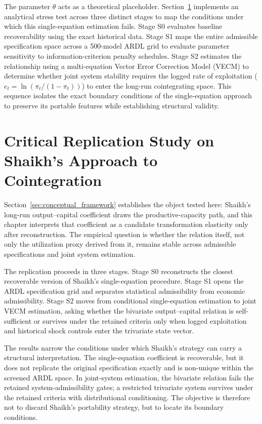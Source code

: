 \documentclass[11pt]{article}
\begin{document}
The parameter $\theta$ acts as a theoretical placeholder. Section~\ref{sec:replication_strategy} implements an analytical stress test across three distinct stages to map the conditions under which this single-equation estimation fails. Stage S0 evaluates baseline recoverability using the exact historical data. Stage S1 maps the entire admissible specification space across a 500-model ARDL grid to evaluate parameter sensitivity to information-criterion penalty schedules. Stage S2 estimates the relationship using a multi-equation Vector Error Correction Model (VECM) to determine whether joint system stability requires the logged rate of exploitation ($e_t = \ln(\pi_t / (1 - \pi_t))$) to enter the long-run cointegrating space. This sequence isolates the exact boundary conditions of the single-equation approach to preserve its portable features while establishing structural validity.

\section{Critical Replication Study on Shaikh’s Approach to Cointegration}
\label{sec:replication_strategy}

Section~\ref{sec:conceptual_framework} establishes the object tested here: Shaikh's long-run output--capital coefficient draws the productive-capacity path, and this chapter interprets that coefficient as a candidate transformation elasticity only after reconstruction. The empirical question is whether the relation itself, not only the utilization proxy derived from it, remains stable across admissible specifications and joint system estimation.

The replication proceeds in three stages. Stage S0 reconstructs the closest recoverable version of Shaikh's single-equation procedure. Stage S1 opens the ARDL specification grid and separates statistical admissibility from economic admissibility. Stage S2 moves from conditional single-equation estimation to joint VECM estimation, asking whether the bivariate output--capital relation is self-sufficient or survives under the retained criteria only when logged exploitation and historical shock controls enter the trivariate state vector.

The results narrow the conditions under which Shaikh's strategy can carry a structural interpretation. The single-equation coefficient is recoverable, but it does not replicate the original specification exactly and is non-unique within the screened ARDL space. In joint-system estimation, the bivariate relation fails the retained system-admissibility gates; a restricted trivariate system survives under the retained criteria with distributional conditioning. The objective is therefore not to discard Shaikh's portability strategy, but to locate its boundary conditions.
\end{document}
